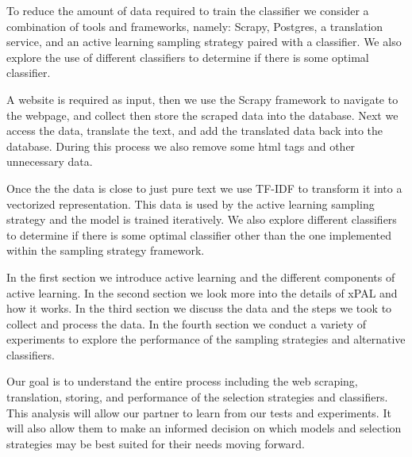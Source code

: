 To reduce the amount of data required to train the classifier we consider a combination of tools and frameworks, namely: Scrapy, Postgres, a translation service, and an active learning sampling strategy paired with a classifier. We also explore the use of different classifiers to determine if there is some optimal classifier.

A website is required as input, then we use the Scrapy framework to navigate to the webpage, and collect then store the scraped data into the database. Next we access the data, translate the text, and add the translated data back into the database. During this process we also remove some html tags and other unnecessary data.

Once the the data is close to just pure text we use TF-IDF to transform it into a vectorized representation. This data is used by the active learning sampling strategy and the model is trained iteratively. We also explore different classifiers to determine if there is some optimal classifier other than the one implemented within the sampling strategy framework.

In the first section we introduce active learning and the different components of active learning. In the second section we look more into the details of xPAL and how it works. In the third section we discuss the data and the steps we took to collect and process the data. In the fourth section we conduct a variety of experiments to explore the performance of the sampling strategies and alternative classifiers. 

Our goal is to understand the entire process including the web scraping, translation, storing, and performance of the selection strategies and classifiers. This analysis will allow our partner to learn from our tests and experiments. It will also allow them to make an informed decision on which models and selection strategies may be best suited for their needs moving forward.